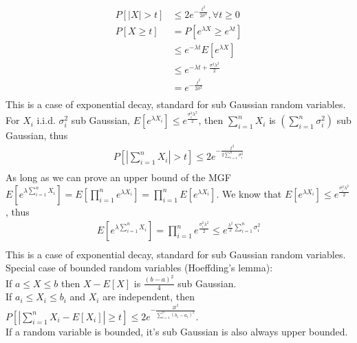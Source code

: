 \documentclass[11pt,a4paper,margin=1in]{article}
\begin{document}
\begin{align*}
    P[|X| > t] &\leq 2 e^{-\frac{t^2}{2\sigma^2}}, \forall t \geq 0 \\
    P[X \geq t] &= P[e^{\lambda X} \geq e^{\lambda t}] \\
    &\leq e^{-\lambda t}E[e^{\lambda X}] \\
    &\leq e^{-\lambda t + \frac{\sigma^2\lambda^2}{2}} \\
    &= e^{-\frac{t^2}{2\sigma^2}} \\
\end{align*}
This is a case of exponential decay, standard for sub Gaussian random variables. \\

\noindent 
For $X_i$ i.i.d. $\sigma_i^2$ sub Gaussian, $E[e^{\lambda X_i}] \leq e^{\frac{\sigma_i^2\lambda^2}{2}}$,
then $\sum_{i=1}^{n}X_i$ is $(\sum_{i=1}^{n}\sigma_i^2)$ sub Gaussian, thus
\begin{gather*}
    P[|\sum_{i=1}^{n}X_i| > t] \leq 2e^{-\frac{t^2}{2\sum_{i=1}^{n}\sigma_i^2}} \\
\end{gather*}
As long as we can prove an upper bound of the MGF $E[e^{\lambda \sum_{i=1}^{n}X_i}] = E[\prod_{i=1}^{n}e^{\lambda X_i}] = \prod_{i=1}^{n}E[e^{\lambda X_i}]$.
We know that $E[e^{\lambda X_i}] \leq e^{\frac{\sigma_i^2\lambda^2}{2}}$, thus
\begin{gather*}
    E[e^{\lambda \sum_{i=1}^{n}X_i}] = \prod_{i=1}^{n}e^{\frac{\sigma_i^2\lambda^2}{2}} \leq e^{\frac{\lambda^2}{2}\sum_{i=1}^{n}\sigma_i^2} \\
\end{gather*}
This is a case of exponential decay, standard for sub Gaussian random variables. \\ 

\noindent
Special case of bounded random variables (Hoeffding's lemma): \\
If $a \leq X \leq b$ then $X - E[X]$ is $\frac{(b - a)^2}{4}$ sub Gaussian. \\
If $a_i \leq X_i \leq b_i$ and $X_i$ are independent, then $P[|\sum_{i=1}^{n}X_i - E[X_i]| \geq t] \leq 2e^{-\frac{2t^2}{\sum_{i=1}^{n}(b_i - a_i)^2}}$. \\
If a random variable is bounded, it's sub Gaussian is also always upper bounded. \\
\end{document}
